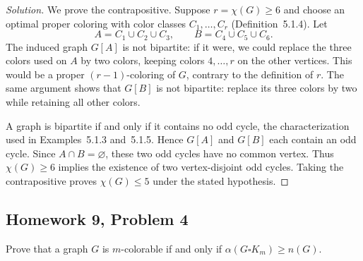 \documentclass[12pt]{amsart}
\newenvironment{solution}{\begin{proof}[Solution]}{\end{proof}}
\begin{document}
    \begin{solution}
        We prove the contrapositive.  Suppose $r=\chi(G)\geq6$ and choose an
        optimal proper coloring with color classes $C_1,\ldots,C_r$
        (Definition~5.1.4).  Let
        \[
            A=C_1\cup C_2\cup C_3,
            \qquad B=C_4\cup C_5\cup C_6.
        \]
        The induced graph $G[A]$ is not bipartite: if it were, we could replace
        the three colors used on $A$ by two colors, keeping colors
        $4,\ldots,r$ on the other vertices.  This would be a proper
        $(r-1)$-coloring of $G$, contrary to the definition of $r$.
        The same argument shows that $G[B]$ is not bipartite: replace its
        three colors by two while retaining all other colors.

        A graph is bipartite if and only if it contains no odd cycle, the
        characterization used in Examples~5.1.3 and~5.1.5.  Hence $G[A]$ and
        $G[B]$ each contain an odd cycle.  Since $A\cap B=\varnothing$, these
        two odd cycles have no common vertex.  Thus $\chi(G)\geq6$ implies
        the existence of two vertex-disjoint odd cycles.  Taking the
        contrapositive proves $\chi(G)\leq5$ under the stated hypothesis.
    \end{solution}

    \subsection*{Homework 9, Problem 4} Prove that a graph $G$ is $m$-colorable if and only if
    $\alpha(G\square K_m) \ge n(G)$.
\end{document}
